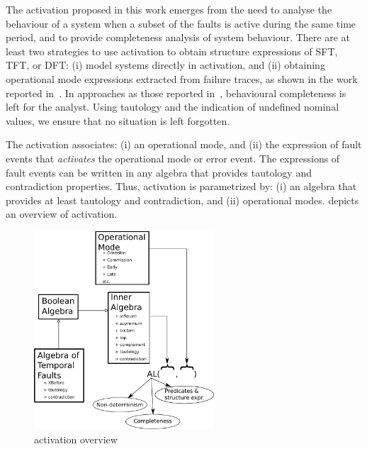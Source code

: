 \documentclass[12pt,openright,twoside,a4paper,oldfontcommands,english,brazil,final]{abntex2}
\theoremstyle{theo}
\begin{document}
The \ac{activation} proposed in this work emerges from the need to analyse the behaviour of a system when a subset of the faults is active during the same time period, and to provide completeness analysis of system behaviour.
%
There are at least two strategies to use \ac{activation} to obtain structure expressions of \ac{SFT}, \ac{TFT}, or \ac{DFT}: (i) model systems directly in \ac{activation}, and (ii) obtaining operational mode expressions extracted from failure traces, as shown in the work reported in~\cite{DM2016}.
%
In approaches as those reported in~\cite{WP2009,Merle2010}, behavioural completeness is left for the analyst.
Using tautology and the indication of undefined nominal values, we ensure that no situation is left forgotten.

The \ac{activation} associates: (i) an operational mode, and (ii) the expression of fault events that \emph{activates} the operational mode or error event.
The expressions of fault events can be written in any algebra that provides tautology and contradiction properties.
Thus, \ac{activation} is parametrized by: (i) an algebra that provides at least tautology and contradiction, and (ii) operational modes.
 depicts an overview of \ac{activation}.
%
\begin{figure}[ht]
  \centering
  \includegraphics[width=0.6\textwidth]{logic-overview}
  \caption{\Ac{activation} overview}
  \label{fig:logic-overview}
\end{figure}


\end{document}
